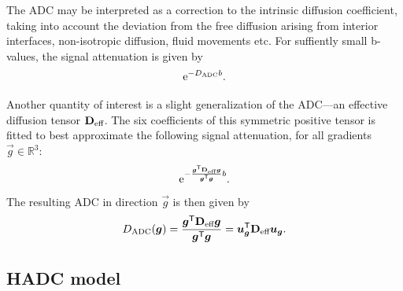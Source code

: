 \documentclass[a4paper]{article}
\begin{document}
The ADC may be interpreted as a correction to the intrinsic diffusion coefficient, taking into account the deviation from the free diffusion arising from interior interfaces, non-isotropic diffusion, fluid movements etc. For suffiently small b-values, the signal attenuation is given by
\begin{equation*}
    \mathrm{e}^{-D_\text{ADC} b}.
\end{equation*}

Another quantity of interest is a slight generalization of the ADC---an effective diffusion tensor $\mathbf{D}_\text{eff}$. The six coefficients of this symmetric positive tensor is fitted to best approximate the following signal attenuation, for all gradients $\vec{g} \in \mathbb{R}^3$:
\begin{equation*}
    \mathrm{e}^{- \frac{\bm{g}^{\mathsf{T}} \mathbf{D}_\text{eff} \bm{g}}{\bm{g}^{\mathsf{T}} \bm{g}} b}.
\end{equation*}
The resulting ADC in direction $\vec{g}$ is then given by
\begin{equation}
    D_\text{ADC}(\bm{g}) = \frac{\bm{g}^{\mathsf{T}} \mathbf{D}_\text{eff} \bm{g}}{\bm{g}^{\mathsf{T}} \bm{g}} = \bm{u}_{\bm{g}}^{\mathsf{T}} \mathbf{D}_\text{eff} \bm{u}_{\bm{g}}.
\end{equation}


\subsection{HADC model}
\end{document}
